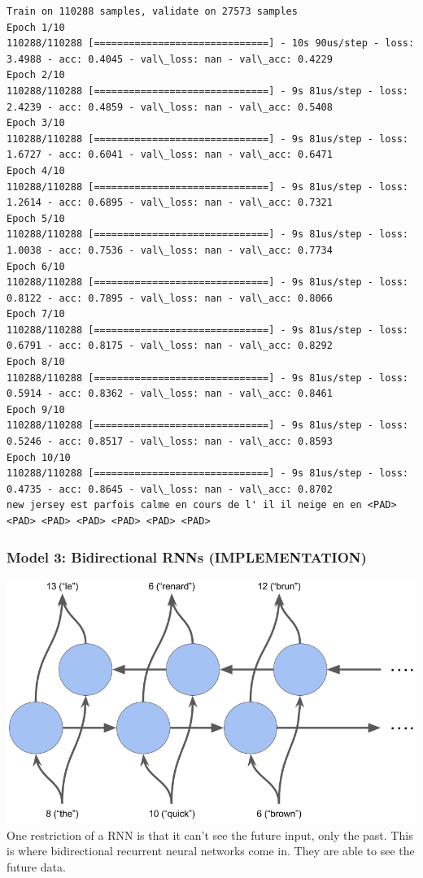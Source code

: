 \documentclass[11pt]{article}
\makeatletter
\def\maxwidth{\ifdim\Gin@nat@width>\linewidth\linewidth
    \else\Gin@nat@width\fi}
\let\Oldincludegraphics\includegraphics
\renewcommand{\includegraphics}[1]{\Oldincludegraphics[width=.8\maxwidth]{#1}}
\makeatother
\begin{document}
    \begin{Verbatim}[commandchars=\\\{\}]
Train on 110288 samples, validate on 27573 samples
Epoch 1/10
110288/110288 [==============================] - 10s 90us/step - loss: 3.4988 - acc: 0.4045 - val\_loss: nan - val\_acc: 0.4229
Epoch 2/10
110288/110288 [==============================] - 9s 81us/step - loss: 2.4239 - acc: 0.4859 - val\_loss: nan - val\_acc: 0.5408
Epoch 3/10
110288/110288 [==============================] - 9s 81us/step - loss: 1.6727 - acc: 0.6041 - val\_loss: nan - val\_acc: 0.6471
Epoch 4/10
110288/110288 [==============================] - 9s 81us/step - loss: 1.2614 - acc: 0.6895 - val\_loss: nan - val\_acc: 0.7321
Epoch 5/10
110288/110288 [==============================] - 9s 81us/step - loss: 1.0038 - acc: 0.7536 - val\_loss: nan - val\_acc: 0.7734
Epoch 6/10
110288/110288 [==============================] - 9s 81us/step - loss: 0.8122 - acc: 0.7895 - val\_loss: nan - val\_acc: 0.8066
Epoch 7/10
110288/110288 [==============================] - 9s 81us/step - loss: 0.6791 - acc: 0.8175 - val\_loss: nan - val\_acc: 0.8292
Epoch 8/10
110288/110288 [==============================] - 9s 81us/step - loss: 0.5914 - acc: 0.8362 - val\_loss: nan - val\_acc: 0.8461
Epoch 9/10
110288/110288 [==============================] - 9s 81us/step - loss: 0.5246 - acc: 0.8517 - val\_loss: nan - val\_acc: 0.8593
Epoch 10/10
110288/110288 [==============================] - 9s 81us/step - loss: 0.4735 - acc: 0.8645 - val\_loss: nan - val\_acc: 0.8702
new jersey est parfois calme en cours de l' il il neige en en <PAD> <PAD> <PAD> <PAD> <PAD> <PAD> <PAD>

    \end{Verbatim}

    \subsubsection{Model 3: Bidirectional RNNs
(IMPLEMENTATION)}\label{model-3-bidirectional-rnns-implementation}

\includegraphics{images/bidirectional.png} One restriction of a RNN is
that it can't see the future input, only the past. This is where
bidirectional recurrent neural networks come in. They are able to see
the future data.
\end{document}
